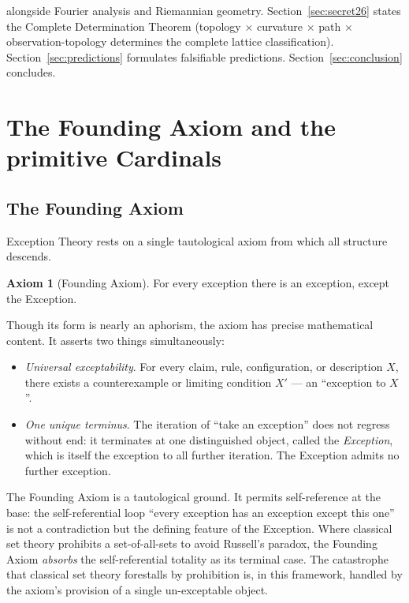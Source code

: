 \documentclass[11pt,a4paper]{article}
\theoremstyle{definition}
\newtheorem{axiom}[theorem]{Axiom}
\theoremstyle{remark}
\begin{document}
alongside Fourier analysis and Riemannian geometry. Section~\ref{sec:secret26} states the Complete Determination Theorem (topology $\times$ curvature $\times$ path $\times$ observation-topology determines the complete lattice classification). Section~\ref{sec:predictions} formulates falsifiable predictions. Section~\ref{sec:conclusion} concludes.

\section{The Founding Axiom and the primitive Cardinals}\label{sec:primitives}

\subsection{The Founding Axiom}

Exception Theory rests on a single tautological axiom from which all structure descends.

\begin{axiom}[Founding Axiom]\label{ax:founding}
For every exception there is an exception, except the Exception.
\end{axiom}

Though its form is nearly an aphorism, the axiom has precise mathematical content. It asserts two things simultaneously:
\begin{itemize}[leftmargin=*]
\item \emph{Universal exceptability}. For every claim, rule, configuration, or description $X$, there exists a counterexample or limiting condition $X'$ --- an ``exception to $X$''.
\item \emph{One unique terminus}. The iteration of ``take an exception'' does not regress without end: it terminates at one distinguished object, called the \emph{Exception}, which is itself the exception to all further iteration. The Exception admits no further exception.
\end{itemize}

The Founding Axiom is a tautological ground. It permits self-reference at the base: the self-referential loop ``every exception has an exception except this one'' is not a contradiction but the defining feature of the Exception. Where classical set theory prohibits a set-of-all-sets to avoid Russell's paradox, the Founding Axiom \emph{absorbs} the self-referential totality as its terminal case. The catastrophe that classical set theory forestalls by prohibition is, in this framework, handled by the axiom's provision of a single un-exceptable object.
\end{document}
